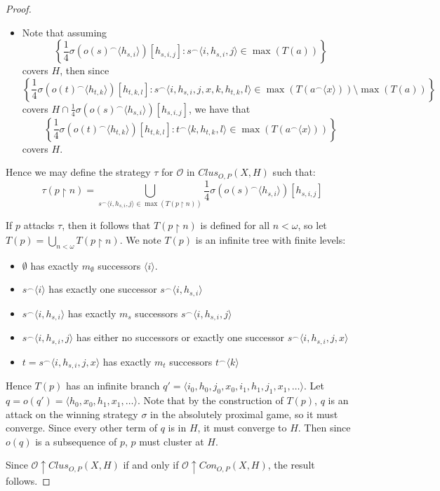 \documentclass{amsart}
\theoremstyle{definition}
\theoremstyle{remark}
\newcommand{\<}{\langle}
\renewcommand{\>}{\rangle}
\newcommand{\congame}[2]{Con_{O,P}(#1,#2)}
\newcommand{\clusgame}[2]{Clus_{O,P}(#1,#2)}
\newcommand{\pl}[1]{\mathscr{#1}}
\newcommand{\win}{\uparrow}
\newcommand{\rest}{\restriction}
\newcommand{\concat}{^\frown}
\begin{document}
\begin{proof}
\begin{itemize}
    \item Note that assuming
      \[
        \left\{\frac{1}{4}\sigma(o(s)\concat\<h_{s,i}\>)[h_{s,i,j}] : s\concat\<i,h_{s,i},j\>\in\max(T(a))\right\}
      \]
    covers $H$, then since
      \[
        \left\{\frac{1}{4}\sigma(o(t)\concat\<h_{t,k}\>)[h_{t,k,l}] : s\concat\<i,h_{s,i},j,x,k,h_{t,k},l\>\in\max(T(a\concat\<x\>))\setminus\max(T(a))\right\}
      \]
    covers $H\cap \frac{1}{4}\sigma(o(s)\concat\<h_{s,i}\>)[h_{s,i,j}]$, we have that
      \[
        \left\{\frac{1}{4}\sigma(o(t)\concat\<h_{t,k}\>)[h_{t,k,l}] : t\concat\<k,h_{t,k},l\>\in\max(T(a\concat\<x\>))\right\}
      \]
    covers $H$.
  \end{itemize}

  Hence we may define the strategy $\tau$ for $\pl O$ in $\clusgame{X}{H}$ such that:
  \[
    \tau(p\rest n) = \bigcup_{s\concat\<i,h_{s,i},j\>\in\max(T(p\rest n))} \frac{1}{4}\sigma(o(s)\concat\<h_{s,i}\>)[h_{s,i,j}]
  \]

  If $p$ attacks $\tau$, then it follows that $T(p\rest n)$ is defined for all $n<\omega$, so let $T(p)=\bigcup_{n<\omega} T(p\rest n)$. We note $T(p)$ is an infinite tree with finite levels:
    \begin{itemize}
      \item $\emptyset$ has exactly $m_\emptyset$ successors $\<i\>$.
      \item $s\concat\<i\>$ has exactly one successor $s\concat\<i,h_{s,i}\>$
      \item $s\concat\<i,h_{s,i}\>$ has exactly $m_s$ successors $s\concat\<i,h_{s,i},j\>$
      \item $s\concat\<i,h_{s,i},j\>$ has either no successors or exactly one successor $s\concat\<i,h_{s,i},j,x\>$
      \item $t=s\concat\<i,h_{s,i},j,x\>$ has exactly $m_t$ successors $t\concat\<k\>$
    \end{itemize}

  Hence $T(p)$ has an infinite branch $q'=\<i_0,h_0,j_0,x_0,i_1,h_1,j_1,x_1,\dots\>$.   Let $q=o(q')=\<h_0,x_0,h_1,x_1,\dots\>$. Note that by the construction of $T(p)$, $q$ is an attack on the winning strategy $\sigma$ in the absolutely proximal game, so it must converge. Since every other term of $q$ is in $H$, it must converge to $H$. Then since $o(q)$ is a subsequence of $p$, $p$ must cluster at $H$.

  Since $\pl O\win\clusgame{X}{H}$ if and only if $\pl O\win\congame{X}{H}$, the result follows.
\end{proof}
\end{document}
